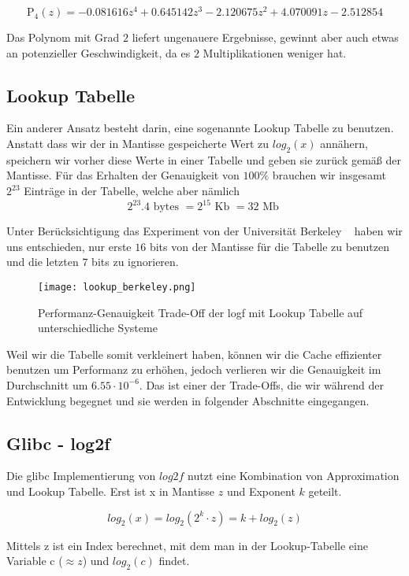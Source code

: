 \begin{equation}
    \mathrm{P_{4}}(z) = -0.081616z^{4} + 0.645142z^{3} -2.120675z^{2} + 4.070091z -2.512854
    \label{eq:deg4}
\end{equation}

Das Polynom mit Grad $2$ liefert ungenauere Ergebnisse, gewinnt aber auch etwas an potenzieller Geschwindigkeit, da es $2$ Multiplikationen weniger hat.

\subsection{Lookup Tabelle }
Ein anderer Ansatz besteht darin, eine sogenannte Lookup Tabelle zu benutzen. Anstatt dass wir der in Mantisse gespeicherte Wert zu $log_2(x)$ annähern, speichern wir vorher diese Werte in einer Tabelle und geben sie zurück gemäß der Mantisse. Für das Erhalten der Genauigkeit von $100\%$ brauchen wir insgesamt $2^{23}$ Einträge in der Tabelle, welche aber nämlich 
\[2^{23} . 4 \text{ bytes } = 2^{15} \text{ Kb } = 32 \text{ Mb }\]

Unter Berücksichtigung das Experiment von der Universität Berkeley ~\cite{fast_log} haben wir uns entschieden, nur erste $16$ bits von der Mantisse für die Tabelle zu benutzen und die letzten $7$ bits zu ignorieren.

\begin{figure}[h]
    \centering
    \texttt{[image: lookup\_berkeley.png]}
    \caption{Performanz-Genauigkeit Trade-Off der logf mit Lookup Tabelle auf unterschiedliche Systeme}
    \label{graph:lookup_berkeley}
\end{figure}

Weil wir die Tabelle somit verkleinert haben, können wir die Cache effizienter benutzen um Performanz zu erhöhen, jedoch verlieren wir die Genauigkeit im Durchschnitt um $6.55 \cdot 10^{-6}$. Das ist einer der Trade-Offs, die wir während der Entwicklung begegnet und sie werden in folgender Abschnitte eingegangen.
 
\subsection{Glibc - log2f}
Die glibc Implementierung von $log2f$ nutzt eine Kombination von Approximation und Lookup Tabelle. Erst ist x in Mantisse $z$ und Exponent $k$ geteilt.

\[log_2(x) = log_2(2^k \cdot z) = k + log_2(z) \]

Mittels z ist ein Index berechnet, mit dem man in der Lookup-Tabelle eine Variable c ($\approx z$) und $log_2(c)$ findet.

